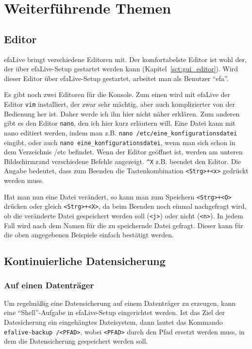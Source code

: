 \documentclass[a4paper,12pt,twoside]{article}
\begin{document}
\section{Weiterführende Themen}
\label{sct:weitere_themen}
\subsection{Editor}
\label{sct:editor}
efaLive bringt verschiedene Editoren
mit. Der komfortabelste Editor ist wohl der, der über efaLive-Setup
gestartet werden kann (Kapitel~\ref{sct:gui_editor}).
Wird dieser Editor über efaLive-Setup gestartet, arbeitet man als
Benutzer "`efa"'.

Es gibt noch zwei Editoren für die Konsole. Zum einen wird mit efaLive
der Editor \texttt{vim} installiert, der zwar sehr
mächtig, aber auch komplizierter von der Bedienung her ist. Daher werde
ich ihn hier nicht näher erklären. Zum anderen gibt es den Editor
\texttt{nano}, den ich hier kurz erläutern will.
Eine Datei kann mit nano editiert werden, indem man z.B.
\texttt{nano /etc/eine\_konfigurationsdatei}
eingibt, oder auch \texttt{nano eine\_konfigurationsdatei},
wenn man sich schon in dem Verzeichnis /etc befindet. Wenn
der Editor geöffnet ist, werden am unteren Bildschirmrand verschiedene
Befehle angezeigt. \texttt{\^{}X} z.B. beendet den
Editor. Die Angabe bedeutet, dass zum Beenden die Tastenkombination
\texttt{{\textless}Strg{\textgreater}+{\textless}x{\textgreater}} gedrückt
werden muss.

Hat man nun eine Datei verändert, so kann man zum Speichern
\texttt{{\textless}Strg{\textgreater}+{\textless}O{\textgreater}} drücken oder
gleich \texttt{{\textless}Strg{\textgreater}+{\textless}X{\textgreater}}, da
beim Beenden noch einmal nachgefragt wird, ob die veränderte Datei
gespeichert werden soll (\texttt{{\textless}j{\textgreater}}) oder nicht
(\texttt{{\textless}n{\textgreater}}). In jedem Fall wird nach dem Namen für die
zu speichernde Datei gefragt. Dieser kann für die oben angegebenen
Beispiele einfach bestätigt werden.


\subsection{Kontinuierliche Datensicherung}
\label{sct:kont_backup}
\subsubsection{Auf einen Datenträger}
\label{sct:cont_device}
Um regelmäßig eine Datensicherung auf einem Datenträger zu erzeugen, 
kann eine "`Shell"'-Aufgabe in efaLive-Setup eingerichtet werden. Ist 
das Ziel der Datesicherung ein eingehängtes Dateisystem, dann lautet 
das Kommando \texttt{efalive-backup /{\textless}PFAD{\textgreater}}, wobei 
\texttt{{\textless}PFAD{\textgreater}} durch den Pfad ersetzt werden muss, in dem die 
Datensicherung gespeichert werden soll.
\end{document}
